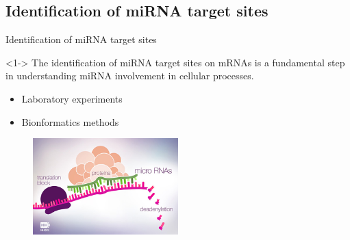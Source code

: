 \documentclass{beamer}
\begin{document}
\subsection{Identification of miRNA target sites}
\begin{frame}{Identification of miRNA target sites}
\begin{exampleblock}
		<1->{}
		The identification of miRNA target sites on mRNAs is a fundamental step in understanding miRNA involvement in cellular processes.
	\end{exampleblock}
	\begin{itemize}
	\item Laboratory experiments
	\item Bionformatics methods
\end{itemize}
\begin{figure}[ht!]
	  \centering
    \includegraphics[width=0.5\textwidth]{images/micro_rna2910516058.jpg} 
\end{figure}
\end{frame}
\end{document}
